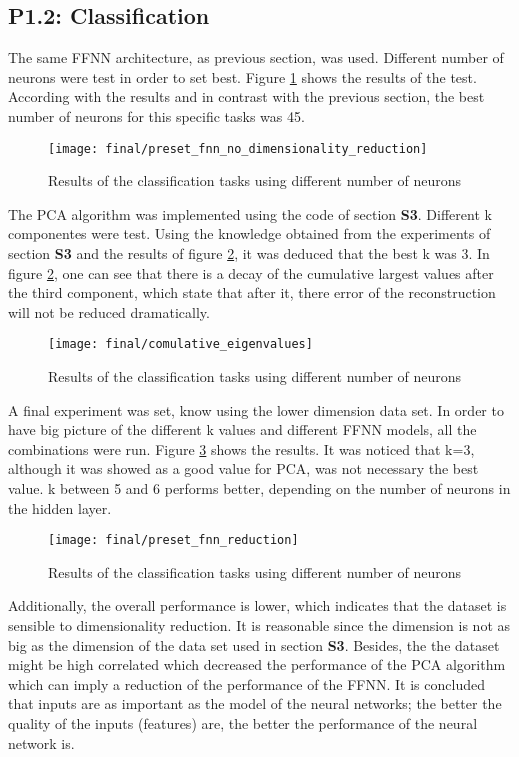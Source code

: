 \subsection{P1.2: Classification}
The same FFNN architecture, as previous section, was used. Different number of neurons were test in order to set best. Figure \ref{final_3__01} shows the results of the test. According with the results and in contrast with the previous section, the best number of neurons for this specific tasks was 45.

\begin{figure}[!htbp]
\caption{Results of the classification tasks using different number of neurons}
\label{final_3__01}
\medbreak
\texttt{[image: final/preset\_fnn\_no\_dimensionality\_reduction]}
\centering
\end{figure}

The PCA algorithm was implemented using the code of section \textbf{S3}. Different k componentes were test. Using the knowledge obtained from the experiments of section \textbf{S3} and the results of figure \ref{final_3_2fff}, it was deduced that the best k was 3. In figure \ref{final_3_2fff}, one can see that there is a decay of the cumulative largest values after the third component, which state that after it, there error of the reconstruction will not be reduced dramatically.

\begin{figure}[!htbp]
\caption{Results of the classification tasks using different number of neurons}
\label{final_3_2fff}
\medbreak
\texttt{[image: final/comulative\_eigenvalues]}
\centering
\end{figure}

A final experiment was set, know using the lower dimension data set. In order to have big picture of the different k values and different FFNN models, all the combinations were run. Figure \ref{final_3_3} shows the results. It was noticed that k=3, although it was showed as a good value for PCA, was not necessary the best value. k between 5 and 6 performs better, depending on the number of neurons in the hidden layer.

\begin{figure}[!htbp]
\caption{Results of the classification tasks using different number of neurons}
\label{final_3_3}
\medbreak
\texttt{[image: final/preset\_fnn\_reduction]}
\centering
\end{figure}

Additionally, the overall performance is lower, which indicates that the dataset is sensible to dimensionality reduction. It is reasonable since the dimension is not as big as the dimension of the data set used in section \textbf{S3}. Besides, the the dataset might be high correlated which decreased the performance of the PCA algorithm which can imply a reduction of the performance of the FFNN. It is concluded that inputs are as important as the model of the neural networks; the better the quality of the inputs (features) are, the better the performance of the neural network is. 

